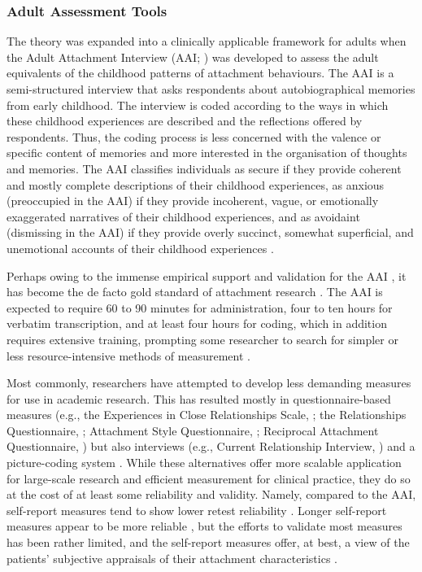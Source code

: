 \documentclass[12pt]{report}
\begin{document}
\subsubsection{Adult Assessment Tools}
The theory was expanded into a clinically applicable framework for adults when the Adult Attachment Interview (AAI; ) was developed to assess the adult equivalents of the childhood patterns of attachment behaviours.
The AAI is a semi-structured interview that asks respondents about autobiographical memories from early childhood.
The interview is coded according to the ways in which these childhood experiences are described and the reflections offered by respondents.
Thus, the coding process is less concerned with the valence or specific content of memories and more interested in the organisation of thoughts and memories.
The AAI classifies individuals as secure if they provide coherent and mostly complete descriptions of their childhood experiences,
as anxious (preoccupied in the AAI) if they provide incoherent, vague, or emotionally exaggerated narratives of their childhood experiences,
and as avoidaint (dismissing in the AAI) if they provide overly succinct, somewhat superficial, and unemotional accounts of their childhood experiences \cite{Hesse1999, AAITest}.

Perhaps owing to the immense empirical support and validation for the AAI \cite{BakermansKranenburg1993, IJzendoorn1995, Crowell1996Discriminant, Sagi1994}, it has become the de facto gold standard of attachment research \cite{AAITest, Talia2019, haltigan2014adult}.
The AAI is expected to require 60 to 90 minutes for administration, four to ten hours for verbatim transcription, and at least four hours for coding, which in addition requires extensive training, prompting some researcher to search for simpler or less resource-intensive methods of measurement \cite{Haas1994}.

Most commonly, researchers have attempted to develop less demanding measures for use in academic research.
This has resulted mostly in questionnaire-based measures (e.g., the Experiences in Close Relationships Scale, ; the Relationships Questionnaire, ; Attachment Style Questionnaire, ; Reciprocal Attachment Questionnaire, ) but also interviews (e.g., Current Relationship Interview, ) and a picture-coding system \cite{George2012}.
While these alternatives offer more scalable application for large-scale research and efficient measurement for clinical practice, they do so at the cost of at least some reliability and validity.
Namely, compared to the AAI, self-report measures tend to show lower retest reliability \cite{Scharfe1994}.
Longer self-report measures appear to be more reliable \cite{Sibley2005,Wongpakaran2021}, but the efforts to validate most measures has been rather limited, and the self-report measures offer, at best, a view of the patients' subjective appraisals of their attachment characteristics \cite{Talia2017}.
\end{document}
